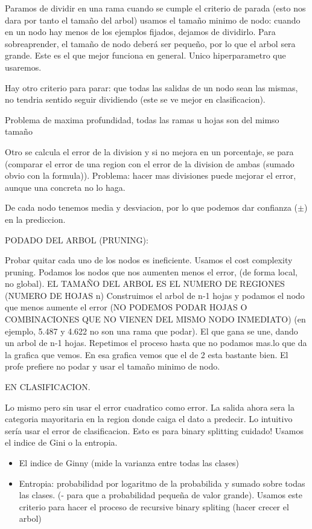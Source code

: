 Paramos de dividir en una rama cuando se cumple el criterio de parada (esto nos dara por tanto el tamaño del arbol) usamos el tamaño minimo de nodo: cuando en un nodo hay menos de los ejemplos fijados, dejamos de dividirlo. Para sobreaprender, el tamaño de nodo deberá ser pequeño, por lo que el arbol sera grande. Este es el que mejor funciona en general. Unico hiperparametro que usaremos. 

Hay otro criterio para parar: que todas las salidas de un nodo sean las mismas, no tendria sentido seguir dividiendo (este se ve mejor en clasificacion). 

Problema de maxima profundidad, todas las ramas u hojas son del mimso tamaño

Otro se calcula el error de la division y si no mejora en un porcentaje, se para (comparar el error de una region con el error de la division de ambas (sumado obvio con la formula)). Problema: hacer mas divisiones puede mejorar el error, aunque una concreta no lo haga. 


De cada nodo tenemos media y desviacion, por lo que podemos dar confianza ($\pm$) en la prediccion.

PODADO DEL ARBOL (PRUNING):

Probar quitar cada uno de los nodos es ineficiente. Usamos el cost complexity pruning. Podamos los nodos que nos aumenten menos el error, (de forma local, no global). EL TAMAÑO DEL ARBOL ES EL NUMERO DE REGIONES (NUMERO DE HOJAS n) Construimos el arbol de n-1 hojas y podamos el nodo que menos aumente el error (NO PODEMOS PODAR HOJAS O COMBINACIONES QUE NO VIENEN DEL MISMO NODO INMEDIATO) (en ejemplo, 5.487 y 4.622 no son una rama que podar). El que gana se une, dando un arbol de n-1 hojas. Repetimos el proceso hasta que no podamos mas.lo que da la grafica que vemos. En esa grafica vemos que el de 2 esta bastante bien. El profe prefiere no podar y usar el tamaño minimo de nodo.


EN CLASIFICACION.

Lo mismo pero sin usar el error cuadratico como error. La salida ahora sera la categoria mayoritaria en la region donde caiga el dato a predecir. Lo intuitivo sería usar el error de clasificacion. Esto es para binary splitting cuidado! Usamos el indice de Gini o la entropia. 
\begin{itemize}
\item El indice de Ginny (mide la varianza entre todas las clases)
\item Entropia: probabilidad por logaritmo de la probabilida y sumado sobre todas las clases. (- para que a probabilidad pequeña de valor grande). Usamos este criterio para hacer el proceso de recursive binary spliting (hacer crecer el arbol)
\end{itemize}

